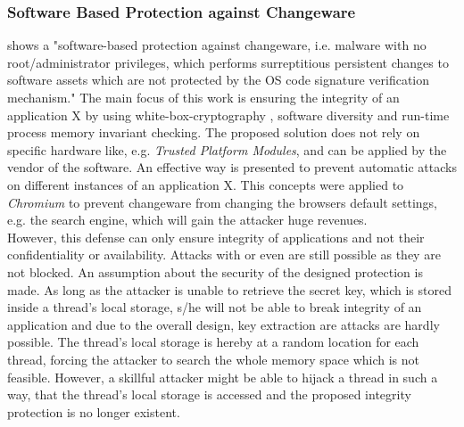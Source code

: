 \subsubsection{Software Based Protection against Changeware}
\cite{changeware} shows a "software-based protection against changeware, i.e. malware with no root/administrator privileges, which performs surreptitious persistent changes to software assets which are not protected by the OS code signature verification mechanism." The main focus of this work is ensuring the integrity of an application X by using white-box-cryptography \cite{wbcrypto}, software diversity \cite{Forrest} and run-time process memory invariant checking. The proposed solution does not rely on specific hardware like, e.g. \emph{Trusted Platform Modules}, and can be applied by the vendor of the software. An effective way is presented to prevent automatic attacks on different instances of an application X. This concepts were applied to \emph{Chromium} to prevent changeware from changing the browsers default settings, e.g. the search engine, which will gain the attacker huge revenues.\\
However, this defense can only ensure integrity of applications and not their confidentiality or availability. Attacks with  or even  are still possible as they are not blocked. An assumption about the security of the designed protection is made. As long as the attacker is unable to retrieve the secret key, which is stored inside a thread's local storage, s/he will not be able to break integrity of an application and due to the overall design, key extraction are attacks are hardly possible. The thread's local storage is hereby at a random location for each thread, forcing the attacker to search the whole memory space which is not feasible. However, a skillful attacker might be able to hijack a thread in such a way, that the thread's local storage is accessed and the proposed integrity protection is no longer existent.